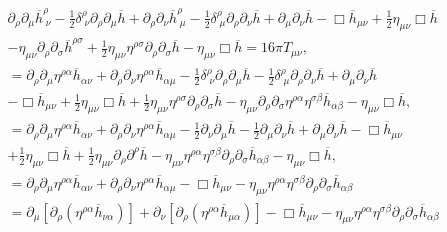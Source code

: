         \begin{align*}
            &\partial_{\rho}\partial_{\mu}\overline{h}^{\rho}_{\;\nu} - \frac{1}{2}\delta^{\rho}_{\;\nu}\partial_{\rho}\partial_{\mu}\overline{h} + \partial_{\rho}\partial_{\nu}\overline{h}^{\rho}_{\;\mu}-\frac{1}{2}\delta^{\rho}_{\;\mu}\partial_{\rho}\partial_{\nu}\overline{h} + \partial_{\mu}\partial_{\nu}\overline{h} - \Box\overline{h}_{\mu\nu} + \frac{1}{2}\eta_{\mu\nu}\Box\overline{h}\\
            &-\eta_{\mu\nu}\partial_{\rho}\partial_{\sigma}\overline{h}^{\rho\sigma} + \frac{1}{2}\eta_{\mu\nu}\eta^{\rho\sigma}\partial_{\rho}\partial_{\sigma}\overline{h}-\eta_{\mu\nu}\Box\overline{h} = 16\pi T_{\mu\nu},\\
            &= \partial_{\rho}\partial_{\mu}\eta^{\rho\alpha}\overline{h}_{\alpha\nu}+\partial_{\rho}\partial_{\nu}\eta^{\rho\alpha}\overline{h}_{\alpha\mu} - \frac{1}{2}\delta^{\rho}_{\;\nu}\partial_{\rho}\partial_{\mu}\overline{h} - \frac{1}{2}\delta^{\rho}_{\;\mu}\partial_{\rho}\partial_{\nu}\overline{h} + \partial_{\mu}\partial_{\nu}\overline{h}\\
            &-\Box\overline{h}_{\mu\nu} + \frac{1}{2}\eta_{\mu\nu}\Box\overline{h} + \frac{1}{2}\eta_{\mu\nu}\eta^{\rho\sigma}\partial_{\rho}\partial_{\sigma}\overline{h} - \eta_{\mu\nu}\partial_{\rho}\partial_{\sigma}\eta^{\rho\alpha}\eta^{\sigma\beta}\overline{h}_{\alpha\beta}-\eta_{\mu\nu}\Box\overline{h},\\
            &=\partial_{\rho}\partial_{\mu}\eta^{\rho\alpha}\overline{h}_{\alpha\nu} + \partial_{\rho}\partial_{\nu}\eta^{\rho\alpha}\overline{h}_{\alpha\mu} - \frac{1}{2}\partial_{\nu}\partial_{\mu}\overline{h} - \frac{1}{2}\partial_{\mu}\partial_{\nu}\overline{h}+\partial_{\mu}\partial_{\nu}\overline{h} - \Box\overline{h}_{\mu\nu}\\
            &+\frac{1}{2}\eta_{\mu\nu}\Box\overline{h} + \frac{1}{2}\eta_{\mu\nu}\partial_{\rho}\partial^{\rho}\overline{h} - \eta_{\mu\nu}\eta^{\rho\alpha}\eta^{\sigma\beta}\partial_{\rho}\partial_{\sigma}\overline{h}_{\alpha\beta}- \eta_{\mu\nu}\Box\overline{h},\\
            &= \partial_{\rho}\partial_{\mu}\eta^{\rho\alpha}\overline{h}_{\alpha\nu}+\partial_{\rho}\partial_{\nu}\eta^{\rho\alpha}\overline{h}_{\alpha\mu} - \Box\overline{h}_{\mu\nu} - \eta_{\mu\nu}\eta^{\rho\alpha}\eta^{\sigma\beta}\partial_{\rho}\partial_{\sigma}\overline{h}_{\alpha\beta}\\
            &= \partial_{\mu}\left[\partial_{\rho}\left(\eta^{\rho\alpha}\overline{h}_{\nu\alpha} \right) \right] + \partial_{\nu}\left[\partial_{\rho}\left(\eta^{\rho\alpha}\overline{h}_{\mu\alpha} \right) \right] - \Box\overline{h}_{\mu\nu} - \eta_{\mu\nu}\eta^{\rho\alpha}\eta^{\sigma\beta}\partial_{\rho}\partial_{\sigma}\overline{h}_{\alpha\beta}\\

\end{align*}
